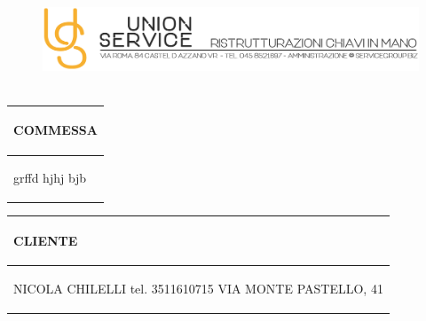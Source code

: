 \documentclass[a4paper]{article}
\begin{document}
                        \begin{figure}[!t]
                        \includegraphics[width=15.8cm, height=3cm]{intestazioneAlta2.jpg}
                        \end{figure}

                        \noindent\begin{tabular}{| L{72.2mm} |}
                            \hline
                            \vspace{2.5mm}
                            \begin{spacing}{0}
                            \textbf{COMMESSA}
                            \end{spacing}\\
                            \hline
                            \vspace{4mm}
                            \begin{spacing}{1.2}

                        grffd \newline hjhj \newline bjb
                          \end{spacing}\\
                            \hline
                          \end{tabular}
                          \quad
                          \begin{tabular}{ | R{72.2mm} | }
                            \hline
                            \vspace{2.5mm}
                            \begin{spacing}{0}
                            \textbf{CLIENTE}
                            \end{spacing}\\
                            \hline
                            \vspace{4mm}
                            \begin{spacing}{1.2}

                       NICOLA CHILELLI \newline tel. 3511610715 \newline VIA MONTE PASTELLO, 41
                          \end{spacing}\\
                            \hline
                          \end{tabular}
\end{document}
